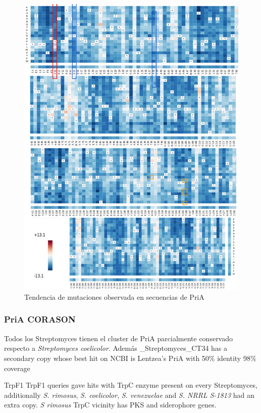\documentclass[12pt,twoside]{reedthesis}
\begin{document}
  \begin{figure}[h!tbp]
  \centering
  \includegraphics[angle = 0,scale = 1]{chapter4/Couplings/PriAMutations.pdf}
  \caption[Tendencia de mutaciones observada en secuencias de PriA]{\normalsize{Tendencia de mutaciones observada en secuencias de PriA}}
  \label{fig:Tendencia de mutaciones observada en secuencias de PriA}
  \end{figure}
  
  \subsubsection{PriA CORASON}\label{pria-corason}
  
  Todos los Streptomyces tienen el cluster de PriA parcialmente conservado
  respecto a \emph{Streptomyces coelicolor}. Además \_Streptomyces\_CT34
  has a secondary copy whose best hit on NCBI is Lentzea's PriA with 50\%
  identity 98\% coverage
  
  TrpF1 TrpF1 queries gave hits with TrpC enzyme present on every
  Streptomyces, additionally \emph{S. rimosus}, \emph{S. coelicolor},
  \emph{S. venezuelae} and \emph{S. NRRL S-1813} had an extra copy.
  \emph{S rimosus} TrpC vicinity has PKS and siderophore genes.
  
\end{document}
